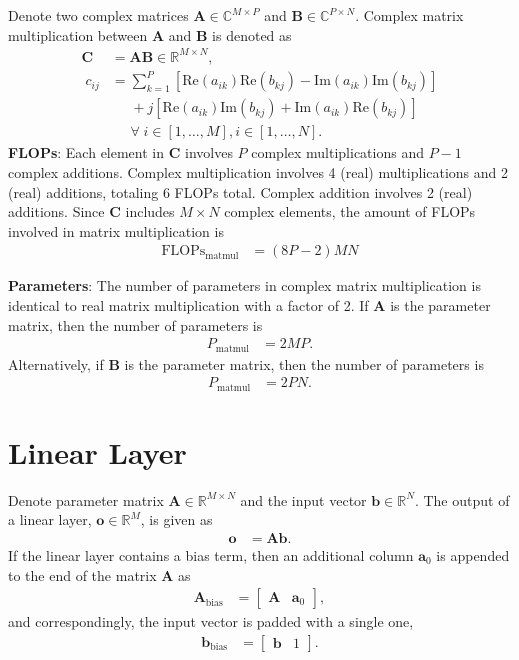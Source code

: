 Denote two complex matrices $\mathbf{A} \in \mathbb{C}^{M \times P}$ and $\mathbf{B} \in \mathbb{C}^{P \times N}$. Complex matrix multiplication between $\mathbf{A}$ and $\mathbf{B}$ is denoted as
\begin{align*}
	\mathbf{C} &= \mathbf{A}\mathbf{B} \in \mathbb{R}^{M\times N},\\ \; c_{ij} &= \sum_{k=1}^P [\text{Re}(a_{ik})\text{Re}(b_{kj}) - \text{Im}(a_{ik})\text{Im}(b_{kj})] \\ &\phantom{\sum} + j[\text{Re}(a_{ik})\text{Im}(b_{kj}) + \text{Im}(a_{ik})\text{Re}(b_{kj})] \\ &\phantom{\sum} \forall \; i\in [1,\dots,M], i\in [1,\dots,N].
\end{align*}
\textbf{FLOPs}: Each element in $\mathbf{C}$ involves $P$ complex multiplications and $P-1$ complex additions. Complex multiplication involves 4 (real) multiplications and 2 (real) additions, totaling 6 FLOPs total. Complex addition involves 2 (real) additions. Since $\mathbf{C}$ includes $M \times N$ complex elements, the amount of FLOPs involved in matrix multiplication is
\begin{align*}
	\text{FLOPs}_{\text{matmul}} &= (8P-2)MN %
\end{align*}

\textbf{Parameters}: The number of parameters in complex matrix multiplication is identical to real matrix multiplication with a factor of 2. If $\mathbf{A}$ is the parameter matrix, then the number of parameters is
\begin{align*}
	P_{\text{matmul}} &= 2MP.
\end{align*}
Alternatively, if $\mathbf{B}$ is the parameter matrix, then the number of parameters is
\begin{align*}
	P_{\text{matmul}} &= 2PN.
\end{align*}

\section{Linear Layer} \label{appdx:complexity-linear}
Denote parameter matrix $\mathbf{A}\in\mathbb{R}^{M\times N}$ and the input vector $\mathbf{b}\in\mathbb{R}^{N}$. The output of a linear layer, $\mathbf{o}\in\mathbb{R}^M$, is given as
\begin{align*}
	\mathbf{o} &= \mathbf{A}\mathbf{b}.
\end{align*}
If the linear layer contains a bias term, then an additional column $\mathbf{a}_0$ is appended to the end of the matrix $\mathbf{A}$ as
\begin{align*}
	\mathbf{A}_{\text{bias}} &= \begin{bmatrix}\mathbf{A} & \mathbf{a}_0\end{bmatrix},
\end{align*}
and correspondingly, the input vector is padded with a single one,
\begin{align*}
	\mathbf{b}_{\text{bias}} &= \begin{bmatrix}\mathbf{b} & 1\end{bmatrix}.
\end{align*}

